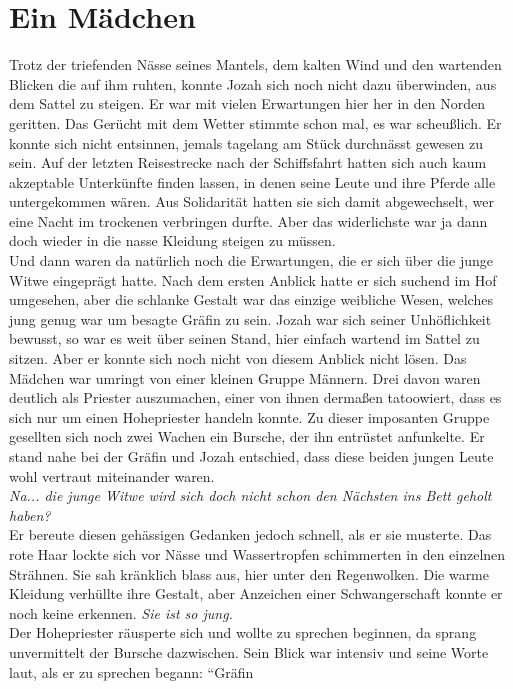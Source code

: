 \chapter{Ein Mädchen}

Trotz der triefenden Nässe seines Mantels, dem kalten Wind und den wartenden Blicken die auf ihm 
ruhten, konnte Jozah sich noch nicht dazu überwinden, aus dem Sattel zu steigen. Er war mit vielen 
Erwartungen hier her in den Norden geritten. Das Gerücht mit dem Wetter stimmte schon mal, es war 
scheußlich. Er konnte sich nicht entsinnen, jemals tagelang am Stück durchnässt gewesen zu sein. Auf 
der letzten Reisestrecke nach der Schiffsfahrt hatten sich auch kaum akzeptable Unterkünfte finden 
lassen, in denen seine Leute und ihre Pferde alle untergekommen wären. Aus Solidarität hatten sie 
sich damit abgewechselt, wer eine Nacht im trockenen verbringen durfte. Aber das widerlichste war 
ja dann doch wieder in die nasse Kleidung steigen zu müssen.\\
Und dann waren da natürlich noch die Erwartungen, die er sich über die junge Witwe eingeprägt 
hatte. Nach dem ersten Anblick hatte er sich suchend im Hof umgesehen, aber die schlanke Gestalt 
war das einzige weibliche Wesen, welches jung genug war um besagte Gräfin zu sein. Jozah war sich 
seiner Unhöflichkeit bewusst, so war es weit über seinen Stand, hier einfach wartend im Sattel zu 
sitzen. Aber er konnte sich noch nicht von diesem Anblick nicht lösen. Das Mädchen war umringt von 
einer kleinen Gruppe Männern. Drei davon waren deutlich als Priester auszumachen, einer von ihnen 
dermaßen tatoowiert, dass es sich nur um einen Hohepriester handeln konnte. Zu dieser imposanten 
Gruppe gesellten sich noch zwei Wachen ein Bursche, der ihn entrüstet anfunkelte. Er stand nahe bei 
der Gräfin und Jozah entschied, dass diese beiden jungen Leute wohl vertraut miteinander waren.\\
\textit{Na... die junge Witwe wird sich doch nicht schon den Nächsten ins Bett geholt haben?}\\
Er bereute diesen gehässigen Gedanken jedoch schnell, als er sie musterte. Das rote Haar lockte 
sich vor Nässe und Wassertropfen schimmerten in den einzelnen Strähnen. Sie sah kränklich blass 
aus, hier unter den Regenwolken. Die warme Kleidung verhüllte ihre Gestalt, aber Anzeichen einer 
Schwangerschaft konnte er noch keine erkennen. \textit{Sie ist so jung.}\\
Der Hohepriester räusperte sich und wollte zu sprechen beginnen, da sprang unvermittelt der Bursche 
dazwischen. Sein Blick war intensiv und seine Worte laut, als er zu sprechen begann: ``Gräfin 

